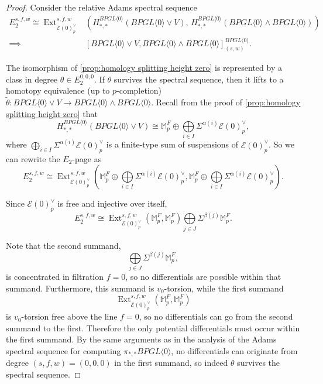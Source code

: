 \documentclass{amsart}
\theoremstyle{plain}
\numberwithin{theorem}{section}
\numberwithin{equation}{section}
\numberwithin{figure}{section}
\DeclareMathOperator{\Ext}{Ext}
\newcommand{\mM}{{\mathbb M}}
\newcommand{\cE}{{\mathcal E}}
\newcommand{\0}{\langle 0 \rangle }
\begin{document}
\begin{proof}
       Consider the relative Adams spectral sequence
\begin{align*}
     E_2^{s,f,w} \cong \Ext_{\cE(0)^\vee_p}^{s,f,w}& \left( H_{*,*}^{BPGL\langle 0 \rangle} \left(BPGL\langle 0 \rangle \vee V \right) , \, H_{*,*}^{BPGL\langle 0 \rangle}\left(BPGL\langle 0 \rangle \wedge BPGL\langle 0 \rangle \right) \right) \\\implies & [BPGL\langle 0 \rangle \vee V , BPGL\langle 0 \rangle \wedge BPGL\langle 0 \rangle]^{BPGL\langle 0 \rangle}_{(s,w)}. 
\end{align*}

The isomorphism of \cref{prop:homology splitting height zero} is represented by a class in degree $\theta \in E_{2}^{0,0,0}$. If $\theta$ survives the spectral sequence, then it lifts to a homotopy equivalence (up to $p$-completion) $\widetilde{\theta}: BPGL\langle 0 \rangle \vee V \to BPGL\langle 0 \rangle \wedge BPGL\langle 0 \rangle$. Recall from the proof of \cref{prop:homology splitting height zero} that 
\[
H_{*,*}^{BPGL\langle 0 \rangle}\left(BPGL\langle 0 \rangle \vee V \right) \cong \mM_{p}^{F} \oplus\bigoplus\limits_{i \in I}\Sigma^{\alpha(i)}\mathcal{E}(0)^\vee_p,
\]
where $\bigoplus\limits_{i \in I}\Sigma^{\alpha(i)}\mathcal{E}(0)^\vee_p$ is a finite-type sum of suspensions of $\cE(0)_p^{\vee}$. So we can rewrite the $E_2$-page as  \[E_2^{s,f,w} \cong \Ext^{s,f,w}_{\cE(0)_p^{\vee}}\left(\mM_{p}^{F} \oplus \bigoplus\limits_{i \in I}\Sigma^{\alpha(i)}\mathcal{E}(0)_p^\vee, \mM_{p}^{F} \oplus \bigoplus\limits_{i \in I}\Sigma^{\alpha(i)}\mathcal{E}(0)_p^\vee\right).\]

Since $\mathcal{E}(0)^\vee_p$ is free and injective over itself,
\[E_2^{s,f,w} \cong \Ext^{s,f,w}_{\cE(0)_p^{\vee}}\left(\mM_{p}^{F}, \mM_{p}^{F}\right) \bigoplus\limits_{j \in J} \Sigma^{\beta(j)}\mM_{p}^{F}.\]

Note that the second summand, 
\[
\bigoplus\limits_{j \in J} \Sigma^{\beta(j)}\mM_{p}^{F},
\] 
is concentrated in filtration $f=0$, so no differentials are possible within that summand. Furthermore, this summand is $v_0$-torsion, while the  first summand 
\[
\Ext^{s,f,w}_{\cE(0)_p^{\vee}}\left(\mM_{p}^{F}, \mM_{p}^{F}\right)
\]
is $v_0$-torsion free above the line $f=0$, so no differentials can go from the second summand to the first. Therefore the only potential differentials must occur within the first summand. By the same arguments as in the analysis of the Adams spectral sequence for computing $\pi_{*,*}BPGL\langle 0 \rangle$, no differentials can originate from degree $(s,f,w) = (0,0,0)$ in the first summand, so indeed $\theta$ survives the spectral sequence.
\end{proof}
\end{document}
